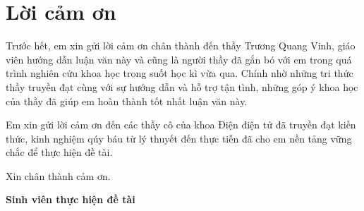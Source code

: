 \chapter*{Lời cảm ơn}
Trước hết, em xin gửi lời cảm ơn chân thành đến thầy Trương Quang Vinh,
giáo viên hướng dẫn luận văn này và cũng là người thầy đã gắn bó với em trong quá trình nghiên cứu khoa học trong suốt học kì vừa qua.
Chính nhờ những tri thức thầy truyền đạt cùng với sự hướng dẫn và hỗ trợ tận tình, những góp ý khoa học của thầy đã giúp em hoàn thành tốt nhất luận văn này.

Em xin gửi lời cảm ơn đến các thầy cô của khoa Điện điện tử đã truyền đạt kiến thức,
kinh nghiệm qúy báu từ lý thuyết đến thực tiễn đã cho em nền tảng vững chắc để thực hiện đề tài.

Xin chân thành cảm ơn.
\begin{flushright}
\textbf{Sinh viên thực hiện đề tài}
\end{flushright}
